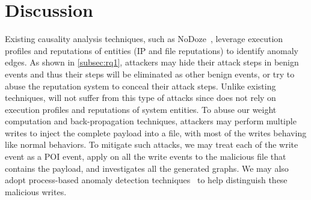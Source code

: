 \section{Discussion}
\label{sec:discussion}


Existing causality analysis techniques, such as NoDoze~\cite{hassan2019nodoze}, leverage execution profiles and reputations of entities (\eg IP and file reputations) to identify anomaly edges.
As shown in \cref{subsec:rq1}, attackers may hide their attack steps in benign events and thus their steps will be eliminated as other benign events, or try to abuse the reputation system to conceal their attack steps.
Unlike existing techniques, \tool will not suffer from this type of attacks since \tool does not rely on execution profiles and reputations of system entities.
To abuse our weight computation and back-propagation techniques, attackers may perform multiple writes to inject the complete payload into a file, with most of the writes behaving like normal behaviors. 
To mitigate such attacks, we may treat each of the write event as a POI event, apply \tool on all the write events to the malicious file that contains the payload, and investigates all the generated graphs. 
We may also adopt process-based anomaly detection techniques~\cite{processanomaly,processanomaly2} to help distinguish these malicious writes.



